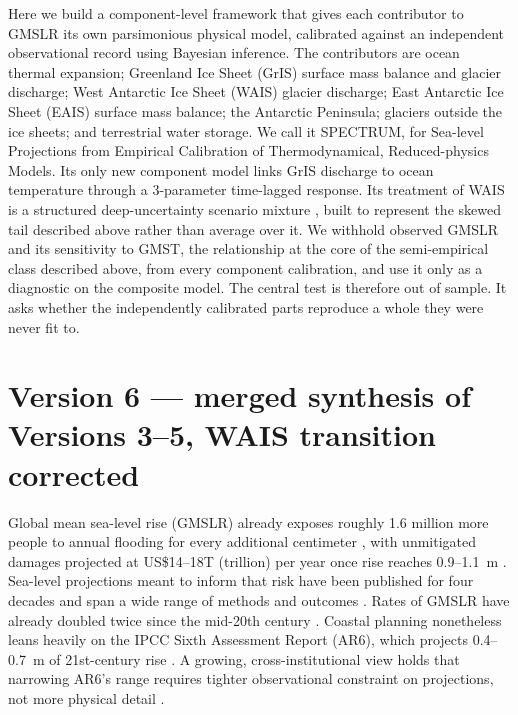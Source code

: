 \documentclass[12pt]{article}
\begin{document}
Here we build a component-level framework that gives each contributor
to GMSLR its own parsimonious physical model, calibrated against an
independent observational record using Bayesian inference. The
contributors are ocean thermal expansion; Greenland Ice Sheet (GrIS)
surface mass balance and glacier discharge; West Antarctic Ice Sheet
(WAIS) glacier discharge; East Antarctic Ice Sheet (EAIS) surface mass
balance; the Antarctic Peninsula; glaciers outside the ice sheets; and
terrestrial water storage. We call it SPECTRUM, for Sea-level
Projections from Empirical Calibration of Thermodynamical,
Reduced-physics Models. Its only new component model links GrIS
discharge to ocean temperature through a 3-parameter time-lagged
response. Its treatment of WAIS is a structured deep-uncertainty
scenario mixture \citep{Bakker2017}, built to represent the skewed tail
described above rather than average over it. We withhold observed
GMSLR and its sensitivity to GMST, the relationship at the core of the
semi-empirical class described above, from every component calibration,
and use it only as a diagnostic on the composite model. The central
test is therefore out of sample. It asks whether the independently
calibrated parts reproduce a whole they were never fit to.

\section*{Version 6 --- merged synthesis of Versions 3--5, WAIS transition corrected}

Global mean sea-level rise (GMSLR) already exposes roughly 1.6
million more people to annual flooding for every additional centimeter
\citep{Kulp2019}, with unmitigated damages projected at US\$14--18T
(trillion) per year once rise reaches 0.9--1.1~m \citep{Jevrejeva2018}.
Sea-level projections meant to inform that risk have been published for
four decades and span a wide range of methods and outcomes
\citep{Garner2026}. Rates of GMSLR have already doubled twice since the
mid-20th century \citep{Frederikse2020,Hamlington2024}. Coastal planning
nonetheless leans heavily on the IPCC Sixth Assessment Report (AR6),
which projects 0.4--0.7~m of 21st-century rise
\citep{Fox-Kemper2021,Hirschfeld2023}. A growing, cross-institutional
view holds that narrowing AR6's range requires tighter observational
constraint on projections, not more physical detail \citep{Felikson2025}.
\end{document}
